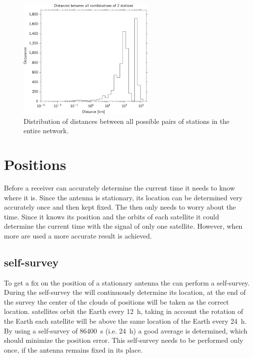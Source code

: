 \begin{figure}
    \centering
    \includegraphics[width=0.6\textwidth]
                    {plots/cluster/network_station_distances}
    \caption{Distribution of distances between all possible pairs of stations in the entire \hisparc network.}
    \label{fig:network_station_distances}
\end{figure}


\section{Positions}

Before a \gps receiver can accurately determine the current time it needs to know where it is. Since the \gps antenna is stationary, its location can be determined very accurately once and then kept fixed. The \gps then only needs to worry about the time. Since it knows its position and the orbits of each \gps satellite it could determine the current time with the signal of only one \gps satellite. However, when more are used a more accurate result is achieved.


\subsection{\gps self-survey}

To get a fix on the position of a stationary \gps antenna the \gps can perform a self-survey. During the self-survey the \gps will continuously determine its location, at the end of the survey the center of the clouds of positions will be taken as the correct location. \gps satellites orbit the Earth every \SI{12}{\hour}, taking in account the rotation of the Earth each \gps satellite will be above the same location of the Earth every \SI{24}{\hour}. By using a self-survey of \SI{86400}{\second} (i.e. \SI{24}{\hour}) a good average is determined, which should minimize the position error. This self-survey needs to be performed only once, if the \gps antenna remains fixed in its place.

